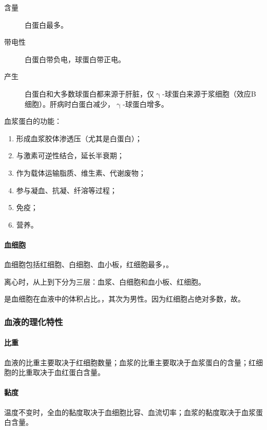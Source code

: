 \begin{description}
	\item[含量] 白蛋白最多。
	\item[带电性] 白蛋白带负电，球蛋白带正电。
	\item[产生] 白蛋白和大多数球蛋白都来源于肝脏，仅$\upgamma$-球蛋白来源于浆细胞（效应B细胞）。肝病时白蛋白减少，$\upgamma$-球蛋白增多。
\end{description}

血浆蛋白的功能：

\begin{enumerate}
	\item 形成血浆胶体渗透压（尤其是白蛋白）；
	\item 与激素可逆性结合，延长半衰期；
	\item 作为载体运输脂质、维生素、代谢废物；
	\item 参与凝血、抗凝、纤溶等过程；
	\item 免疫；
	\item 营养。
\end{enumerate}

\paragraph{血细胞}

血细胞包括红细胞、白细胞、血小板，红细胞最多，。

离心时，从上到下分为三层：血浆、白细胞和血小板、红细胞。

是血细胞在血液中的体积占比。，其次为男性。因为红细胞占绝对多数，故。

\subsubsection{血液的理化特性}

\paragraph{比重}

血液的比重主要取决于红细胞数量；血浆的比重主要取决于血浆蛋白的含量；红细胞的比重取决于血红蛋白含量。

\paragraph{黏度}

温度不变时，全血的黏度取决于血细胞比容、血流切率；血浆的黏度取决于血浆蛋白含量。

